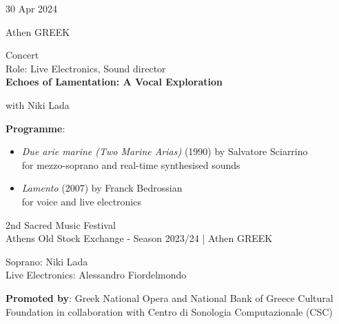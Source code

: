 \documentclass[7pt,a4paper]{article}
\begin{document}
\begin{mdframed}[
    backgroundcolor=entrygray,
    linecolor=entrygray,
    linewidth=0pt,
    innerleftmargin=6pt,
    innerrightmargin=6pt,
    innertopmargin=6pt,
    innerbottommargin=6pt,
    skipabove=0pt,
    skipbelow=0pt
]

\begin{minipage}[t]{0.28\textwidth}

30 Apr 2024

\scriptsize Athen GREEK


\end{minipage}
\begin{minipage}[t]{0.68\textwidth}
\small Concert
\\\scriptsize Role: Live Electronics, Sound director
\\ \normalsize \textbf{Echoes of Lamentation: A Vocal Exploration}

\par\scriptsize with Niki Lada
\vspace{0.25cm}

\par \scriptsize \textbf{Programme}:\par
\begin{itemize}

\item \textit{Due arie marine (Two Marine Arias)} (1990) by Salvatore Sciarrino\\ for mezzo-soprano and real-time synthesised sounds

\item \textit{Lamento} (2007) by Franck Bedrossian\\ for voice and live electronics

\end{itemize}
\vspace{0.2cm}



\small 2nd Sacred Music Festival\\Athens Old Stock Exchange - Season 2023/24 | \scriptsize Athen GREEK

\vspace{0.1cm}
\scriptsize

Soprano: Niki Lada\\Live Electronics: Alessandro Fiordelmondo

\vspace{0.1cm}
\par \textbf{Promoted by}: Greek National Opera and National Bank of Greece Cultural Foundation in collaboration with Centro di Sonologia Computazionale (CSC)
\end{minipage}
\vspace{0.25cm}
\end{mdframed}
\end{document}

